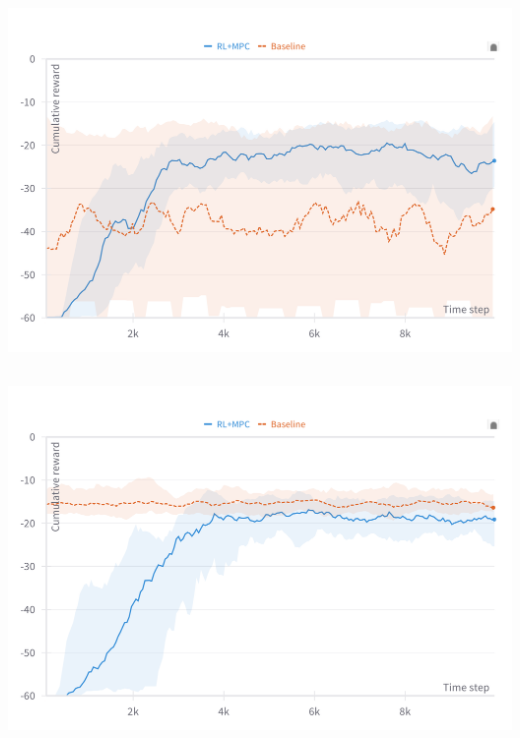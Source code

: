 \documentclass[
  letterpaper,
  DIV=11,
  numbers=noendperiod,
  oneside]{scrartcl}
\begin{document}
\subsection{}\label{section-49}

\begin{center}
\includegraphics{figs/reward-RL-baseline-badmodel.png}
\end{center}

\subsection{}\label{section-50}

\begin{center}
\includegraphics{figs/reward-RL-baseline-goodmodel.png}
\end{center}

\subsection{}\label{section-51}
\end{document}
